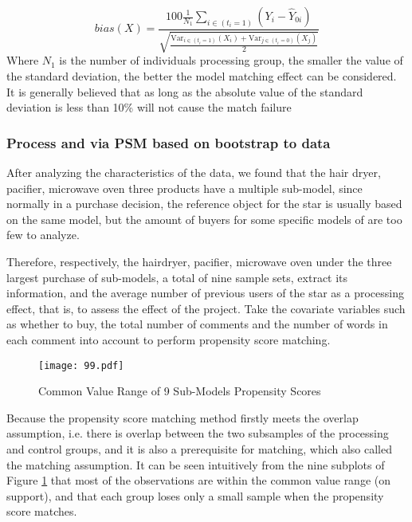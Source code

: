 \documentclass{mcmthesis}
\begin{document}
\begin{itemize}
\begin{equation}
\end{equation}
\begin{equation}
bias\left( X \right) =\frac{100\frac{1}{N_1}\sum_{i\in \left( t_i=1 \right)}{\left( Y_i-\hat{Y}_{0i} \right)}}{\sqrt{\frac{\text{Var}_{i\in \left( t_i=1 \right)}\left( X_i \right) +\text{Var}_{j\in \left( t_i=0 \right)}\left( X_j \right)}{2}}} 
\end{equation}
Where $N_1$ is the number of individuals processing group, the smaller the value of the standard deviation, the better the model matching effect can be considered. It is generally believed that as long as the absolute value of the standard deviation is less than 10\% will not cause the match failure
\end{itemize}

\subsubsection{Process and via PSM based on bootstrap to data}
After analyzing the characteristics of the data, we found that the hair dryer, pacifier, microwave oven three products have a multiple sub-model, since normally in a purchase decision, the reference object for the star is usually based on the same model, but the amount of buyers for some specific models of are too few to analyze. 

Therefore, respectively, the hairdryer, pacifier, microwave oven under the three largest purchase of sub-models, a total of nine sample sets, extract its information, and the average number of previous users of the star as a processing effect, that is, to assess the effect of the project. Take the covariate variables such as whether to buy, the total number of comments and the number of words in each comment into account to perform propensity score matching.




\begin{figure}[H]
	\small
	\centering
	\texttt{[image: 99.pdf]}
	\caption{Common Value Range of 9 Sub-Models Propensity Scores} 
	\label{fig:90}
\end{figure}
Because the propensity score matching method firstly meets the overlap assumption, i.e. there is overlap between the two subsamples of the processing and control groups, and it is also a prerequisite for matching, which also called the matching assumption. It can be seen intuitively from the nine subplots of Figure \ref{fig:90} that most of the observations are within the common value range (on support), and that each group loses only a small sample when the propensity score matches.
\end{document}
